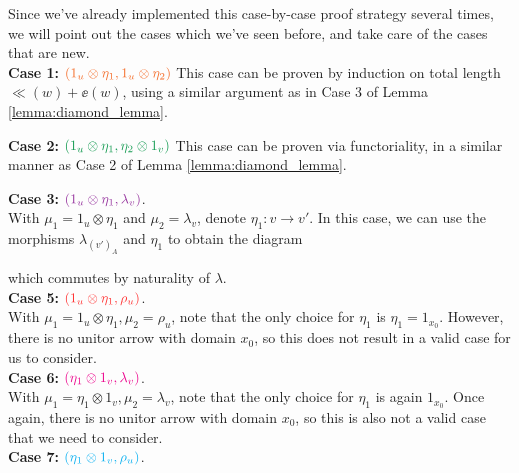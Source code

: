 \begin{prf}
Since we've already implemented this case-by-case proof strategy several times, 
we will point out the cases which we've seen before, and take care of the cases 
that are new. 
\\
\textbf{Case 1:} $\textcolor{Orange}{(1_u \otimes \eta_1 ,1_u \otimes \eta_2)}$
This case can be proven by induction on total length $\ll(w) + \ee(w)$, using 
a similar argument as in Case 3 of Lemma \ref{lemma:diamond_lemma}.


\textbf{Case 2:} $\textcolor{ForestGreen}{(1_u \otimes \eta_1, \eta_2\otimes 1_v)}$ 
This case can be proven via functoriality, in a similar manner as
Case 2 of Lemma \ref{lemma:diamond_lemma}.

\textbf{Case 3:} $\textcolor{Purple}{(1_u\otimes \eta_1, \lambda_v)}$.\\
With $\mu_1 = 1_u\otimes \eta_1$ and $\mu_2 = \lambda_v$, denote $\eta_1: v \to v'$.
In this case, we can use the morphisms $\lambda_{(v')_A}$ and $\eta_1$ to obtain the 
diagram
\begin{center}
\end{center}
which commutes by naturality of $\lambda$. 
\\
\textbf{Case 5:} $\textcolor{red!80!White}{(1_u\otimes\eta_1 ,\rho_u)}$.\\
With $\mu_1 = 1_u\otimes \eta_1, \mu_2 = \rho_u$, note that the only 
choice for  $\eta_1$ is $\eta_1 = 1_{x_0}$. However, there is no unitor 
arrow with domain $x_0$, so this does not result in a valid case for us to consider.
\\
\textbf{Case 6:} $\textcolor{Magenta}{(\eta_1\otimes 1_v, \lambda_v)}$.
\\
With $\mu_1 = \eta_1\otimes  1_v, \mu_2 = \lambda_v$, note that the  only 
choice for $\eta_1$ is again $1_{x_0}$. Once again, there is no unitor arrow 
with domain $x_0$, so this is also not a valid case that we need to consider.
\\
\textbf{Case 7:} $\textcolor{ProcessBlue}{(\eta_1 \otimes 1_v, \rho_u)}$.

\end{prf}
